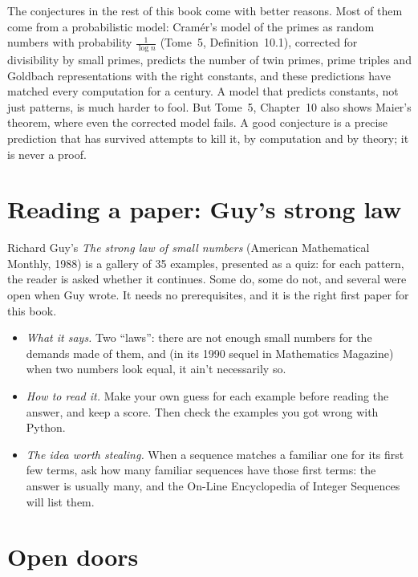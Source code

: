 The conjectures in the rest of this book come with better reasons. Most of them come from a probabilistic model: Cram\'er's model of the primes as random
numbers with probability $\frac1{\log n}$ (Tome~5, Definition~10.1), corrected for divisibility by small primes, predicts the number of twin primes, prime
triples and Goldbach representations with the right constants, and these predictions have matched every computation for a century. A model that predicts
constants, not just patterns, is much harder to fool. But Tome~5, Chapter~10 also shows Maier's theorem, where even the corrected model fails. A good
conjecture is a precise prediction that has survived attempts to kill it, by computation and by theory; it is never a proof.

\section{Reading a paper: Guy's strong law}

Richard Guy's \emph{The strong law of small numbers} (American Mathematical Monthly, 1988) is a gallery of 35 examples, presented as a quiz: for each pattern,
the reader is asked whether it continues. Some do, some do not, and several were open when Guy wrote. It needs no prerequisites, and it is the right first paper
for this book.
\begin{itemize}
\item \emph{What it says.} Two ``laws'': there are not enough small numbers for the demands made of them, and (in its 1990 sequel in Mathematics Magazine) when
two numbers look equal, it ain't necessarily so.
\item \emph{How to read it.} Make your own guess for each example before reading the answer, and keep a score. Then check the examples you got wrong with
Python.
\item \emph{The idea worth stealing.} When a sequence matches a familiar one for its first few terms, ask how many familiar sequences have those first terms:
the answer is usually many, and the On-Line Encyclopedia of Integer Sequences will list them.
\end{itemize}

\section{Open doors}


